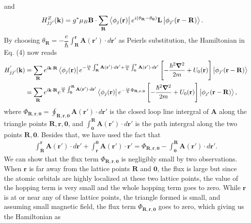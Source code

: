 \documentclass{report}
\newcommand{\f}[2]{\dfrac{#1}{#2}}
\begin{document}
and
\begin{align}
	H_{jj'}^{Z}(\mathbf{k})
	& = g^{*} \mu_{B} \mathbf{B} \cdot \sum_{\mathbf{R}} \bra{\phi_{j}(\mathbf{r})} e^{i(\theta_{\mathbf{R}} - \theta_{\mathbf{0}} )} \mathbf{L} \ket{\phi_{j'}(\mathbf{r - R})}.
\end{align}
By choosing $\theta_{\mathbf{R}} = - \f{e}{\hbar} \int_{\mathbf{R}}^{\mathbf{r}} \mathbf{A(\mathbf{r'})} \cdot d\mathbf{r'}$ as Peierls substitution, the Hamiltonian in Eq. (4) now reads
\begin{align}
	H_{jj'}^{'}(\mathbf{k})
	& = \sum_{\mathbf{R}} e^{i\mathbf{k \cdot R}} \bra{\phi_{j}(\mathbf{r})} e^{ - \frac{ie}{\hbar} \int_{\mathbf{R}}^{\mathbf{r}} \mathbf{A}(\mathbf{r'}) \cdot d\mathbf{r'} + \frac{ie}{\hbar}\int_{\mathbf{0}}^{\mathbf{r}}\mathbf{A(\mathbf{r'})}\cdot d\mathbf{r'} } \left[- \f{\hbar^{2} \boldsymbol{\nabla}^{2}}{2m} + U_{0} (\mathbf{r}) \right] \ket{\phi_{j'}(\mathbf{r - R})} \nonumber \\
	& = \sum_{\mathbf{R}} e^{i \mathbf{k \cdot R}} e^{\frac{ie}{\hbar} \int_{\mathbf{0}}^{\mathbf{R}} \mathbf{A(\mathbf{r'})} \cdot d \mathbf{r'} } \bra{\phi_{j}(\mathbf{r})} e^{-\frac{ie}{\hbar} \Phi_{\mathbf{R,r,0}}} \left[ -\f{\hbar^{2} \boldsymbol{\nabla}^{2}}{2m} + U_{0} (\mathbf{r}) \right] \ket{\phi_{j'}(\mathbf{r - R})},
\end{align}
where $\Phi_{\mathbf{R,r,0}} = \oint_{\mathbf{R,r,0}} \mathbf{A(\mathbf{r'})} \cdot d\mathbf{r'} $ is the closed loop line intergral of $\mathbf{A}$ along the triangle points $\mathbf{R,r,0}$, and $\int_{\mathbf{0}}^{\mathbf{R}} \mathbf{A(\mathbf{r'})} \cdot d \mathbf{r'}$ is the path intergral along the two points $\mathbf{R,0}$. Besides that, we have used the fact that
\begin{align}
	\int_{\mathbf{R}}^{\mathbf{r}} \mathbf{A(\mathbf{r'})} \cdot d\mathbf{r'} + \int_{\mathbf{r}}^{\mathbf{0}} \mathbf{A(r')} \cdot \mathbf{r'} = \Phi_{\mathbf{R,r,0}} - \int_{\mathbf{0}}^{\mathbf{R}} \mathbf{A(\mathbf{r'})} \cdot d \mathbf{r'}.
\end{align}
We can show that the flux term $\Phi_{\mathbf{R,r,0}}$ is negligibly small \cite{yalcin_2019} by two observations. When $\mathbf{r}$ is far away from the lattice points $\mathbf{R}$ and $\mathbf{0}$, the flux is large but since the atomic orbitals are highly localized at these two lattice points, the value of the hopping term is very small and the whole hopping term goes to zero. While $\mathbf{r}$ is at or near any of these lattice points, the triangle formed is small, and assuming small magnetic field, the flux term $\Phi_{\mathbf{R,r,0}}$ goes to zero, which giving us the Hamiltonian as
\end{document}
